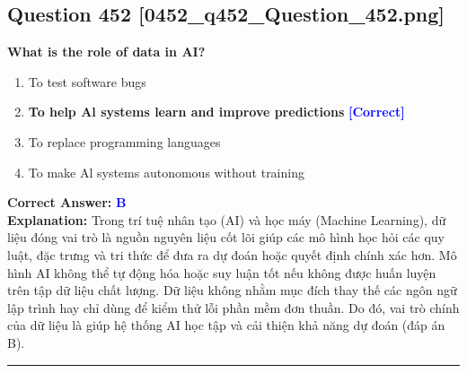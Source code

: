 \documentclass[11pt,a4paper]{article}
\begin{document}
\begin{minipage}{\textwidth}
\subsection*{Question 452 \quad \footnotesize{[0452\_q452\_Question\_452.png]}}
\noindent \textbf{What is the role of data in AI?}

\begin{enumerate}[label=\Alph*.]
    \item To test software bugs
    \item \textbf{To help Al systems learn and improve predictions} \hfill \textcolor{blue}{\textbf{[Correct]}}
    \item To replace programming languages
    \item To make Al systems autonomous without training
\end{enumerate}

\noindent \textbf{Correct Answer:} \textcolor{blue}{\textbf{B}} \\[2pt]
\noindent \textbf{Explanation:} Trong trí tuệ nhân tạo (AI) và học máy (Machine Learning), dữ liệu đóng vai trò là nguồn nguyên liệu cốt lõi giúp các mô hình học hỏi các quy luật, đặc trưng và tri thức để đưa ra dự đoán hoặc quyết định chính xác hơn. Mô hình AI không thể tự động hóa hoặc suy luận tốt nếu không được huấn luyện trên tập dữ liệu chất lượng. Dữ liệu không nhằm mục đích thay thế các ngôn ngữ lập trình hay chỉ dùng để kiểm thử lỗi phần mềm đơn thuần. Do đó, vai trò chính của dữ liệu là giúp hệ thống AI học tập và cải thiện khả năng dự đoán (đáp án B).

\par\vspace{0.3cm}
\hrule
\vspace{0.3cm}
\end{minipage}
\end{document}
